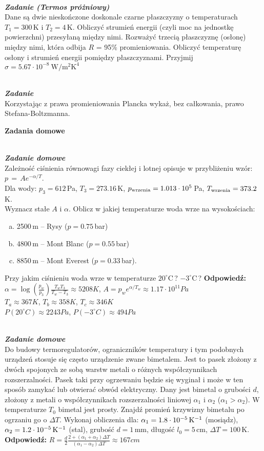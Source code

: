 \documentclass[11pt,a4paper]{article}
\newcounter{zadanie}\newcommand{\zadanie}[1][]{\addtocounter{zadanie}{1} ~\\  {\bf \emph{Zadanie \arabic{zadanie} #1 }} \\}
\newcounter{zaddom}\newcommand{\zaddom}[1][]{\addtocounter{zaddom}{1} ~\\  {\bf \emph{Zadanie domowe \arabic{zaddom} #1 }} \\}
\begin{document}
\zadanie [(Termos próżniowy)]
Dane są dwie nieskończone doskonale czarne płaszczyzny o temperaturach $T_1=300\,$K i $T_2=4$\,K.
Obliczyć strumień energii (czyli moc na jednostkę powierzchni)
przesyłaną między nimi. Rozważyć trzecią płaszczyznę (osłonę)
między nimi, która odbija $R$ = 95\% promieniowania. 
Obliczyć temperaturę osłony i strumień energii pomiędzy płaszczyznami.
Przyjmij $\sigma = 5.67\cdot 10^{-8}~\mathrm{W/m^{2}K^{4}}$

\zadanie
Korzystając z prawa promieniowania Plancka wykaż, bez całkowania, prawo Stefana-Boltzmanna.

\pagebreak
\begin{centering}
\bf{ Zadania domowe }\\[1mm]
\end{centering}
\vspace{1mm}

\zaddom
Zależność ciśnienia równowagi fazy ciekłej i lotnej opisuje 
w przybliżeniu wzór: $ p \,=\, A e^{-\alpha /T} $.\\
Dla wody: $p_3 = 612\,$Pa, $T_3 = 273.16\,$K, 
$p_{\rm wrzenia} = 1.013\cdot 10^5\,$Pa, 
$T_{\rm wrzenia} = 373.2\,$K.\\ 
Wyznacz stałe $A$ i $\alpha$.
Oblicz w jakiej temperaturze woda wrze na wysokościach:
\begin{enumerate}[a)] 
\item 2500\,m -- Rysy ($p = 0.75\,$bar)
\item 4800\,m -- Mont Blanc ($p = 0.55\,$bar)
\item 8850\,m -- Mont Everest ($p = 0.33\,$bar).
\end{enumerate}
Przy jakim ciśnieniu woda wrze w temperaturze $20^\circ$C\,? $-3^\circ$C\,?
\vskip 10pt
\textbf{Odpowiedź:}
 $\alpha = \log\left(\frac{p_w}{p_3}\right)\frac{T_wT_3}{T_w-T_3} \approx 5208 K$, $A= p_w e^{\alpha/T_w} \approx 1.17 \cdot 10^{11} Pa$\\
$T_a \approx 367 K$, $T_b \approx 358 K$, $T_c \approx 346 K$\\
$P(20^\circ C) \approx 2243 Pa$, $P(-3^\circ C) \approx 494 Pa$

\zaddom
Do budowy termoregulatorów, ograniczników temperatury i tym
podobnych urządzeń stosuje się często urządzenie zwane bimetalem.
Jest to pasek złożony z dwóch spojonych ze sobą warstw metali
o różnych współczynnikach rozszerzalności.
Pasek taki przy ogrzewaniu będzie się wyginał i może
w ten sposób zamykać lub otwierać obwód elektryczny.
Dany jest bimetal o grubości $d$, złożony z metali
o współczynnikach rozszerzalności liniowej $\alpha_1$ i $\alpha_2$
($\alpha_1 > \alpha_2$).
W temperaturze $T_0$ bimetal jest prosty.
Znajdź promień krzywizny bimetalu po ogrzaniu go o $\Delta T$.
Wykonaj obliczenia dla: $\alpha_1=1.8\cdot 10^{-5}\,{\rm K}^{-1}$ (mosiądz),
$\alpha_2=1.2\cdot 10^{-5}\,{\rm K}^{-1}$ (stal), grubość $d=1\,$mm,
długość $l_0=5\,$cm, $\Delta T=100\,$K.
\vskip 10pt
\textbf{Odpowiedź:}
$R = \frac{d}{2} \frac{2+(\alpha_1+\alpha_2)\Delta T}{(\alpha_1-\alpha_2)\Delta T} \approx 167 cm$
\end{document}
